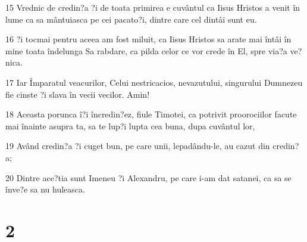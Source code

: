 \par 15 Vrednic de credin?a ?i de toata primirea e cuvântul ca Iisus Hristos a venit în lume ca sa mântuiasca pe cei pacato?i, dintre care cel dintâi sunt eu.
\par 16 ?i tocmai pentru aceea am fost miluit, ca Iisus Hristos sa arate mai întâi în mine toata îndelunga Sa rabdare, ca pilda celor ce vor crede în El, spre via?a ve?nica.
\par 17 Iar Împaratul veacurilor, Celui nestricacios, nevazutului, singurului Dumnezeu fie cinste ?i slava în vecii vecilor. Amin!
\par 18 Aceasta porunca î?i încredin?ez, fiule Timotei, ca potrivit proorociilor facute mai înainte asupra ta, sa te lup?i lupta cea buna, dupa cuvântul lor,
\par 19 Având credin?a ?i cuget bun, pe care unii, lepadându-le, au cazut din credin?a;
\par 20 Dintre ace?tia sunt Imeneu ?i Alexandru, pe care i-am dat satanei, ca sa se înve?e sa nu huleasca.

\chapter{2}

